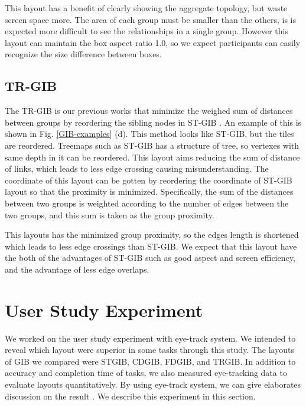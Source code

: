 \documentclass{llncs}
\begin{document}
This layout has a benefit of clearly showing the aggregate topology, but waste screen space more.
The area of each group must be smaller than the others, is is expected more difficult to see the relationships in a single group.
However this layout can maintain the box aspect ratio 1.0, so we expect participants can easily recognize the size difference between boxes.


\subsection{TR-GIB}
The TR-GIB is our previous works that minimize the weighed sum of distances between groups by reordering the sibling nodes in ST-GIB \cite{onoue}.
An example of this is shown in Fig. \ref{GIB-examples} (d).
This method looks like ST-GIB, but the tiles are reordered.
Treemaps such as ST-GIB has a structure of tree, so vertexes with same depth in it can be reordered.
This layout aims reducing the sum of distance of links, which leads to less edge crossing causing misunderstanding.
The coordinate of this layout can be gotten by reordering the coordinate of ST-GIB layout so that the proximity is minimized.
Specifically, the sum of the distances between two groups is weighted according to the number of edges between the two groups, and this sum is taken as the group proximity.

This layouts has the minimized group proximity, so the edges length is shortened which leads to less edge crossings than ST-GIB.
We expect that this layout have the both of the advantages of ST-GIB such as good aspect and screen efficiency, and the advantage of less edge overlaps.

%
\section{User Study Experiment}
%
We worked on the user study experiment with eye-track system.
We intended to reveal which layout were superior in some tasks through this study.
The layouts of GIB we compared were STGIB, CDGIB, FDGIB, and TRGIB.
In addition to accuracy and completion time of tasks, we also measured eye-tracking data to evaluate layouts quantitatively.
By using eye-track system, we can give elaborates discussion on the result \cite{eyemethod}.
We describe this experiment in this section.
\end{document}
